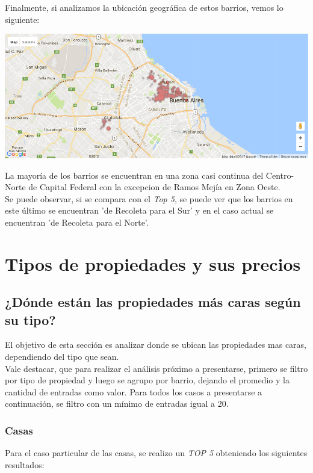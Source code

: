 \documentclass[a4paper, 10pt]{article}
\newcommand\tab[1][0.5cm]{\hspace*{#1}}
\begin{document}
				  	\tab Finalmente, si analizamos la ubicación geográfica de estos barrios, vemos lo siguiente:
				  	\begin{center}
   		    				\includegraphics[width=\textwidth]{images/storeSurfaceBottomMap}
				  	\end{center}
				  	\tab La mayoría de los barrios se encuentran en una zona casi continua del Centro-Norte de Capital Federal con
				  	la excepcion de Ramos Mejía en Zona Oeste. \\
				  	\tab Se puede observar, si se compara con el \emph{Top 5}, se puede ver que los barrios en este último se
				  	encuentran 'de Recoleta para el Sur' y en el caso actual se encuentran 'de Recoleta para el Norte'. 
		\section{Tipos de propiedades y sus precios}
			\subsection{¿Dónde están las propiedades más caras según su tipo?}
				El objetivo de esta sección es analizar donde se ubican las propiedades mas caras, dependiendo del tipo que sean. \\
				Vale destacar, que para realizar el análisis próximo a presentarse, primero se filtro por tipo de propiedad y luego se agrupo por barrio, dejando el promedio y la cantidad de entradas como valor. Para todos los casos a presentarse a continuación, se filtro con un mínimo de entradas igual a 20.
				 			
				\subsubsection{Casas}
				Para el caso particular de las casas, se realizo un \emph{TOP 5} obteniendo los siguientes resultados:
				
\end{document}
